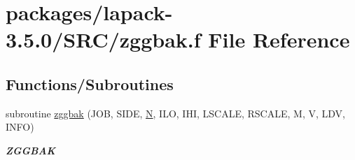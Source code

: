 \hypertarget{zggbak_8f}{}\section{packages/lapack-\/3.5.0/\+S\+R\+C/zggbak.f File Reference}
\label{zggbak_8f}
\subsection*{Functions/\+Subroutines}
\begin{DoxyCompactItemize}
\item 
subroutine \hyperlink{group__complex16GBcomputational_gaa379093bafefd601c50d4017add97bcc}{zggbak} (J\+O\+B, S\+I\+D\+E, \hyperlink{polmisc_8c_a0240ac851181b84ac374872dc5434ee4}{N}, I\+L\+O, I\+H\+I, L\+S\+C\+A\+L\+E, R\+S\+C\+A\+L\+E, M, V, L\+D\+V, I\+N\+F\+O)
\begin{DoxyCompactList}\small\item\em {\bfseries Z\+G\+G\+B\+A\+K} \end{DoxyCompactList}\end{DoxyCompactItemize}
